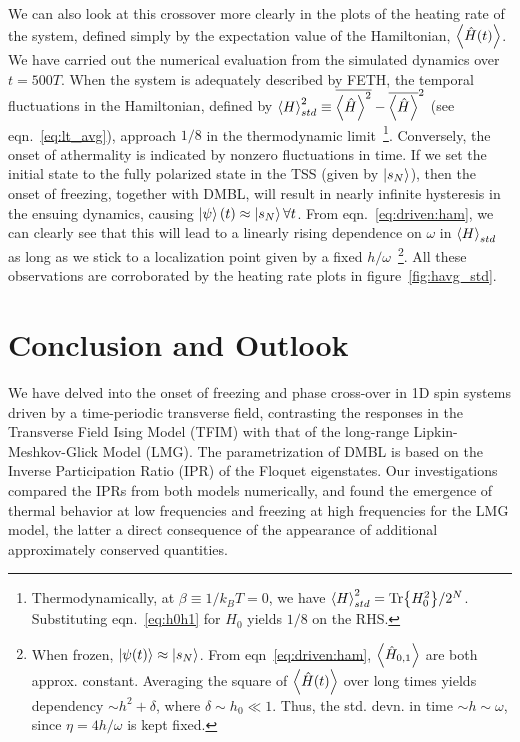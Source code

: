 \documentclass[%
reprint,
superscriptaddress,
amsmath,amssymb,
aps,
prb,
showkeys,
]{revtex4-2}
\begin{document}
	We can also look at this crossover more clearly in the plots of the heating rate of the system, defined simply by the expectation value of the Hamiltonian, $\expval{\hat{H}(t)}$. We have carried out the numerical evaluation from the simulated dynamics over $t=500 T$. When the system is adequately described by FETH, the temporal fluctuations in the {Hamiltonian}, defined by $\expval{H}^2_{std}\equiv \overline{\expval{\hat{H}}^2}-\overline{\expval{\hat{H}}}^2$ (see eqn.~\ref{eq:lt_avg}), approach $1/8$ in the thermodynamic limit~\footnote{Thermodynamically, at $\beta\equiv 1/k_BT=0$, we have $\expval{H}^2_{std}=\Tr{H^2_0}/2^N$. Substituting eqn.~\ref{eq:h0h1} for $H_0$ yields $1/8$ on the RHS.}. Conversely, the onset of athermality is indicated by nonzero fluctuations in time. If we set the initial state to the fully polarized state in the TSS (given by $\ket{s_N}$), then the 
	onset of freezing, together with DMBL, will result in nearly infinite hysteresis in the ensuing dynamics, causing $\ket{\psi}(t)\approx \ket{s_N} \forall t$. From eqn.~\ref{eq:driven:ham}, we can clearly see that this will lead to a linearly rising dependence on $\omega$ in $\expval{H}_{std}$ as long as we stick to a {localization point given by a fixed} $h/\omega$~\footnote{When frozen, $\ket{\psi(t)}\approx \ket{s_N}$. From eqn~\ref{eq:driven:ham}, $\expval{\hat{H}_{0,1}}$ are both approx. constant. Averaging the square of $\expval{\hat{H}(t)}$ over long times yields dependency  $\sim h^2 + \delta$, where $\delta\sim h_0\ll 1$. Thus, the std. devn. in time $\sim h\sim \omega$, since $\eta=4h/\omega$ is kept fixed.}. All these observations are corroborated by the heating rate plots in figure~\ref{fig:havg_std}.	
	\section{\label{sec:level7}Conclusion and Outlook}
	We have delved into the onset of freezing and phase cross-over in 1D spin systems driven by a time-periodic transverse field, contrasting the responses in the Transverse Field Ising Model (TFIM) with that of the long-range Lipkin-Meshkov-Glick Model (LMG). The parametrization of DMBL is based on the Inverse Participation Ratio (IPR) of the Floquet eigenstates. Our investigations compared the IPRs from both models numerically, and found the emergence of thermal behavior at low frequencies and freezing at high frequencies for the LMG model, the latter a direct consequence of the appearance of additional approximately conserved quantities.
	
\end{document}
